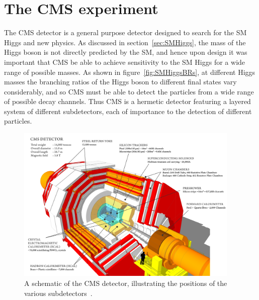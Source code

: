 \section{The CMS experiment}
\label{sec:CMSInDetail}

The CMS detector is a general purpose detector designed to search for the
\ac{SM} Higgs and new physics. As discussed in section~\ref{sec:SMHiggs}, the
mass of the Higgs boson is not directly predicted by the \ac{SM}, and hence upon
design it was important that CMS be able to achieve sensitivity to the \ac{SM} Higgs for a
wide range of possible masses. As shown in figure~\ref{fig:SMHiggsBRs}, at different
Higgs masses the branching ratios of the Higgs boson to different final states
vary considerably, and so CMS must be able to detect the particles from a wide
range of possible decay channels. Thus CMS is a hermetic detector featuring
a layered system of different subdetectors, each of importance to the detection
of different particles. 

\begin{figure}[htbp]
   \includegraphics[width=0.95\textwidth]{plots/detector/CMS_Schematic.png}
\caption[A schematic of the CMS detector, illustrating the positions of the
various subdetectors.]
{A schematic of the CMS detector, illustrating the positions of the
various subdetectors~\cite{1742-6596-513-2-022032}.}
\label{fig:CMSschematic}
\end{figure}

